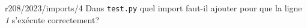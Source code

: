 \begin{question}{r208/2023/imports/4}
  Dans \texttt{test.py} quel import faut-il ajouter pour que la ligne
  {\em 1} s'exécute correctement?
  \begin{reponses}
  \end{reponses}
\end{question}

